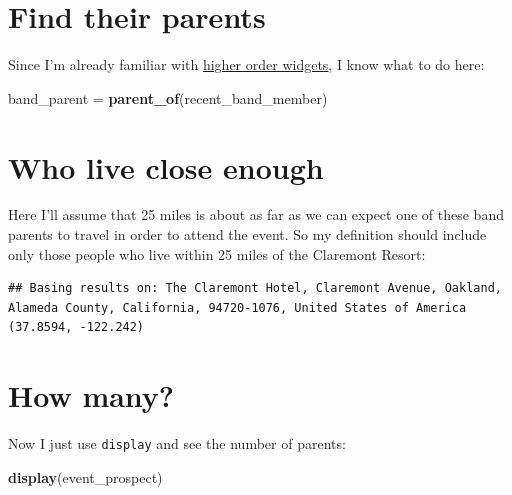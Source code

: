 \documentclass[]{book}
\newenvironment{Shaded}{\begin{snugshade}}{\end{snugshade}}
\newcommand{\DataTypeTok}[1]{\textcolor[rgb]{0.13,0.29,0.53}{#1}}
\newcommand{\DecValTok}[1]{\textcolor[rgb]{0.00,0.00,0.81}{#1}}
\newcommand{\KeywordTok}[1]{\textcolor[rgb]{0.13,0.29,0.53}{\textbf{#1}}}
\newcommand{\NormalTok}[1]{#1}
\newcommand{\OperatorTok}[1]{\textcolor[rgb]{0.81,0.36,0.00}{\textbf{#1}}}
\newcommand{\StringTok}[1]{\textcolor[rgb]{0.31,0.60,0.02}{#1}}
\begin{document}
\hypertarget{find-their-parents}{%
\section{Find their parents}\label{find-their-parents}}

Since I'm already familiar with \protect\hyperlink{higher-order-widgets}{higher order widgets}, I know what to do here:

\begin{Shaded}
\begin{Highlighting}[]
\NormalTok{band_parent =}\StringTok{ }\KeywordTok{parent_of}\NormalTok{(recent_band_member)}
\end{Highlighting}
\end{Shaded}

\hypertarget{who-live-close-enough}{%
\section{Who live close enough}\label{who-live-close-enough}}

Here I'll assume that 25 miles is about as far as we can expect one of these band parents to travel in order to attend the event. So my definition should include only those people who live within 25 miles of the Claremont Resort:

\begin{Shaded}
\end{Shaded}

\begin{verbatim}
## Basing results on: The Claremont Hotel, Claremont Avenue, Oakland, Alameda County, California, 94720-1076, United States of America (37.8594, -122.242)
\end{verbatim}

\hypertarget{how-many}{%
\section{How many?}\label{how-many}}

Now I just use \texttt{display} and see the number of parents:

\begin{Shaded}
\begin{Highlighting}[]
\KeywordTok{display}\NormalTok{(event_prospect)}
\end{Highlighting}
\end{Shaded}
\end{document}
